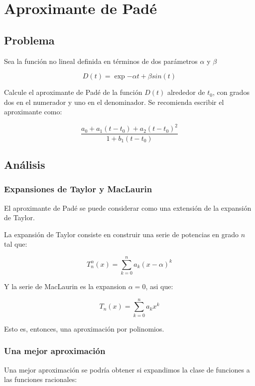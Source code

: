 \section{Aproximante de Padé}


\subsection{Problema}

Sea la función no lineal definida en términos de dos parámetros $\alpha$ y $\beta$

\begin{equation}
	D(t) = \exp{-\alpha t} + \beta sin(t) 
\end{equation}

Calcule el aproximante de Padé de la función $D(t)$ alrededor de $t_0$, con grados dos en el numerador y uno en el denominador. Se recomienda escribir el aproximante como:

$$
\frac{a_0 + a_1 ( t - t_0) + a_2(t - t_0)^2 }{ 1 + b_1(t - t_0) }
$$


\subsection{Análisis}


\subsubsection{Expansiones de Taylor y MacLaurin}

El aproximante de Padé se puede considerar como una extensión de la expansión de Taylor. 

La expansión de Taylor consiste en construir una serie de potencias en grado $n$ tal que:

$$
T_n^{\alpha}(x) = \sum_{k = 0}^{n} a_k (x - \alpha)^k 
$$

Y la serie de MacLaurin es la expansion $\alpha = 0$, asi que:

$$
T_n(x) = \sum_{k = 0}^{n} a_k x^k 
$$


Esto es, entonces, una aproximación por polinomios. 


\subsubsection{Una mejor aproximación}

Una mejor aproximación se podría obtener si expandimos la clase de funciones a las funciones racionales:


